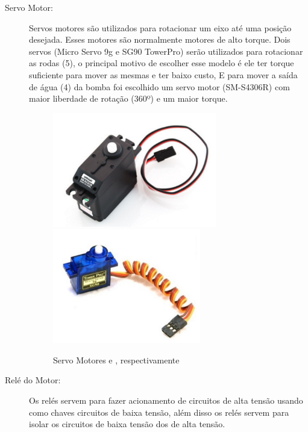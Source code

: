 \begin{description}
\item[Servo Motor:] Servos motores são utilizados para rotacionar um eixo até
uma posição desejada. Esses motores são normalmente motores de alto torque.
Dois servos (Micro Servo 9g e SG90 TowerPro) serão utilizados para rotacionar
as rodas (5), o principal motivo de escolher esse modelo é ele ter torque
suficiente para mover as mesmas e ter baixo custo, E para mover a saída de água
(4) da bomba foi escolhido um servo motor (SM-S4306R) com maior liberdade de
rotação (360º) e um maior torque.
\begin{figure}[h]
  \centering
	\includegraphics[height=5cm]{figures/servant-motor.png}
	\quad
	\includegraphics[height=5cm]{figures/micro-motor.png}
  \caption{Servo Motores \cite{flipflop2013} e \cite{flipflop2016}, respectivamente}
\end{figure}
\FloatBarrier

\item[Relé do Motor:] Os relés servem para fazer acionamento de circuitos
de alta tensão usando como chaves circuitos de baixa tensão, além disso os
 relés servem para isolar os circuitos de baixa tensão dos de alta tensão.
 

\end{description}
